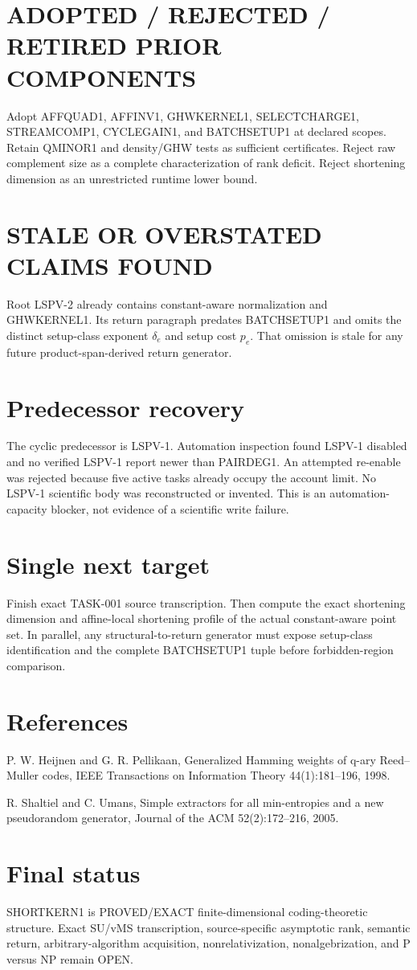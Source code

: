 \documentclass[11pt]{article}
\begin{document}
\section*{ADOPTED / REJECTED / RETIRED PRIOR COMPONENTS}
Adopt AFFQUAD1, AFFINV1, GHWKERNEL1, SELECTCHARGE1, STREAMCOMP1, CYCLEGAIN1, and BATCHSETUP1 at declared scopes. Retain QMINOR1 and density/GHW tests as sufficient certificates. Reject raw complement size as a complete characterization of rank deficit. Reject shortening dimension as an unrestricted runtime lower bound.

\section*{STALE OR OVERSTATED CLAIMS FOUND}
Root LSPV-2 already contains constant-aware normalization and GHWKERNEL1. Its return paragraph predates BATCHSETUP1 and omits the distinct setup-class exponent \(\delta_e\) and setup cost \(p_e\). That omission is stale for any future product-span-derived return generator.

\section*{Predecessor recovery}
The cyclic predecessor is LSPV-1. Automation inspection found LSPV-1 disabled and no verified LSPV-1 report newer than PAIRDEG1. An attempted re-enable was rejected because five active tasks already occupy the account limit. No LSPV-1 scientific body was reconstructed or invented. This is an automation-capacity blocker, not evidence of a scientific write failure.

\section*{Single next target}
Finish exact TASK-001 source transcription. Then compute the exact shortening dimension and affine-local shortening profile of the actual constant-aware point set. In parallel, any structural-to-return generator must expose setup-class identification and the complete BATCHSETUP1 tuple before forbidden-region comparison.

\section*{References}
P. W. Heijnen and G. R. Pellikaan, Generalized Hamming weights of q-ary Reed--Muller codes, IEEE Transactions on Information Theory 44(1):181--196, 1998.

R. Shaltiel and C. Umans, Simple extractors for all min-entropies and a new pseudorandom generator, Journal of the ACM 52(2):172--216, 2005.

\section*{Final status}
SHORTKERN1 is PROVED/EXACT finite-dimensional coding-theoretic structure. Exact SU/vMS transcription, source-specific asymptotic rank, semantic return, arbitrary-algorithm acquisition, nonrelativization, nonalgebrization, and P versus NP remain OPEN.

\end{document}
